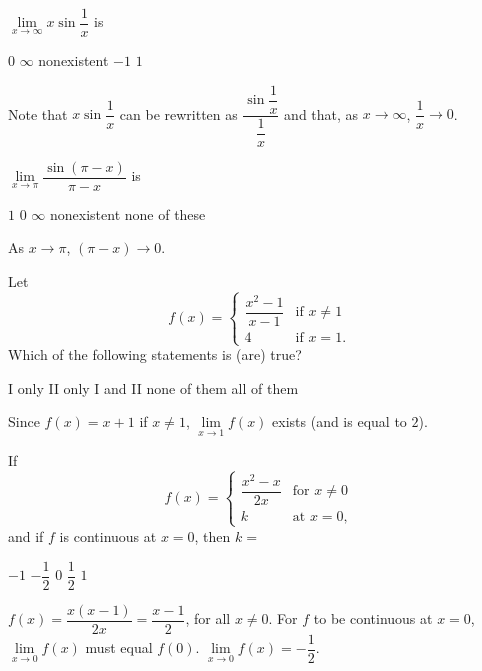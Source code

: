 \question
$\lim\limits_{x \to \infty} x \sin \dfrac{1}{x}$ is
\begin{choices}
  \choice $0$
  \choice $\infty$
  \choice nonexistent
  \choice $-1$
  \CorrectChoice $1$
\end{choices}
\begin{solution}
Note that $x \sin \dfrac{1}{x}$ can be rewritten as $\dfrac{\sin \dfrac{1}{x}}{\dfrac{1}{x}}$ and that, as $x \rightarrow \infty$, $\dfrac{1}{x} \rightarrow 0$.
\end{solution}


\newpage

\question
$\lim\limits_{x \to \pi} \dfrac{\sin (\pi-x)}{\pi-x}$ is
\begin{choices}
  \CorrectChoice $1$
  \choice $0$
  \choice $\infty$
  \choice nonexistent
  \choice none of these
\end{choices}
\begin{solution}
As $x \rightarrow \pi$, $(\pi-x) \rightarrow 0$.
\end{solution}

\question
Let
\[
f(x)= \begin{cases}\dfrac{x^{2}-1}{x-1} & \text{if } x \neq 1 \\ 4 & \text{if } x=1.\end{cases}
\]
Which of the following statements is (are) true?
\begin{choices}
  \choice I only
  \choice II only
  \CorrectChoice I and II
  \choice none of them
  \choice all of them
\end{choices}
\begin{solution}
Since $f(x)=x+1$ if $x \neq 1$, $\lim\limits_{x \to 1} f(x)$ exists (and is equal to $2$).
\end{solution}

\question
If
\[
f(x)=\begin{cases}\dfrac{x^{2}-x}{2 x} & \text{for } x \neq 0 \\ k & \text{at } x=0,\end{cases}
\]
and if $f$ is continuous at $x=0$, then $k=$
\begin{choices}
  \choice $-1$
  \CorrectChoice $-\dfrac{1}{2}$
  \choice $0$
  \choice $\dfrac{1}{2}$
  \choice $1$
\end{choices}
\begin{solution}
$f(x)=\dfrac{x(x-1)}{2 x}=\dfrac{x-1}{2}$, for all $x \neq 0$. For $f$ to be continuous at $x=0$, $\lim\limits_{x \to 0} f(x)$ must equal $f(0)$. $\lim\limits_{x \to 0} f(x)=-\dfrac{1}{2}$.
\end{solution}


